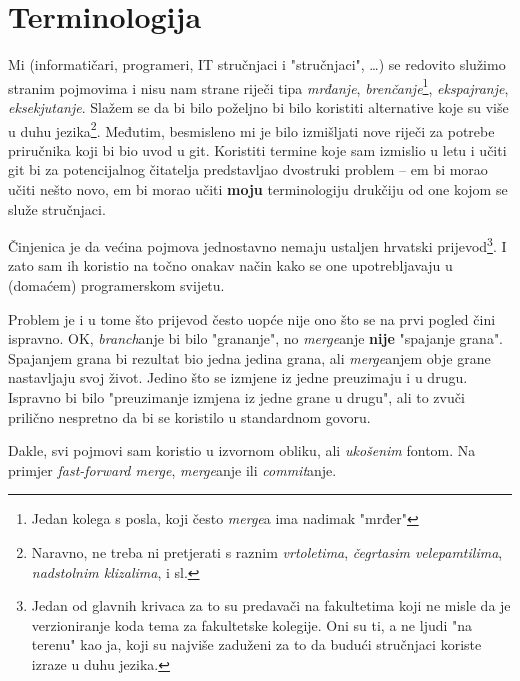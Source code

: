 \chapter*{Terminologija}

Mi (informatičari, programeri, IT stručnjaci i "stručnjaci", \dots) se redovito služimo stranim pojmovima i nisu nam strane riječi tipa \emph{mrđanje}, \emph{brenčanje}\footnote{Jedan kolega s posla, koji često \emph{merge}a ima nadimak "mrđer"}, \emph{ekspajranje}, \emph{eksekjutanje}.
Slažem se da bi bilo poželjno bi bilo koristiti alternative koje su više u duhu jezika\footnote{Naravno, ne treba ni pretjerati s raznim \emph{vrtoletima}, \emph{čegrtasim velepamtilima}, \emph{nadstolnim klizalima}, i sl.}.
Međutim, besmisleno mi je bilo izmišljati nove riječi za potrebe priručnika koji bi bio uvod u git.
Koristiti termine koje sam izmislio u letu i učiti git bi za potencijalnog čitatelja predstavljao dvostruki problem -- em bi morao učiti nešto novo, em bi morao učiti \textbf{moju} terminologiju drukčiju od one kojom se služe stručnjaci.

Činjenica je da većina pojmova jednostavno nemaju ustaljen hrvatski prijevod\footnote{Jedan od glavnih krivaca za to su predavači na fakultetima koji ne misle da je verzioniranje koda tema za fakultetske kolegije. Oni su ti, a ne ljudi "na terenu" kao ja, koji su najviše zaduženi za to da budući stručnjaci koriste izraze u duhu jezika.}. 
I zato sam ih koristio na točno onakav način kako se one upotrebljavaju u (domaćem) programerskom svijetu.

Problem je i u tome što prijevod često uopće nije ono što se na prvi pogled čini ispravno.
OK, \emph{branch}anje bi bilo "grananje", no \emph{merge}anje \textbf{nije} "spajanje grana". 
Spajanjem grana bi rezultat bio jedna jedina grana, ali \emph{merge}anjem obje grane nastavljaju svoj život. 
Jedino što se izmjene iz jedne preuzimaju i u drugu. 
Ispravno bi bilo "preuzimanje izmjena iz jedne grane u drugu", ali to zvuči prilično nespretno da bi se koristilo u standardnom govoru.

Dakle, svi pojmovi sam koristio u izvornom obliku, ali \emph{ukošenim} fontom. Na primjer \emph{fast-forward merge}, \emph{merge}anje ili \emph{commit}anje.


